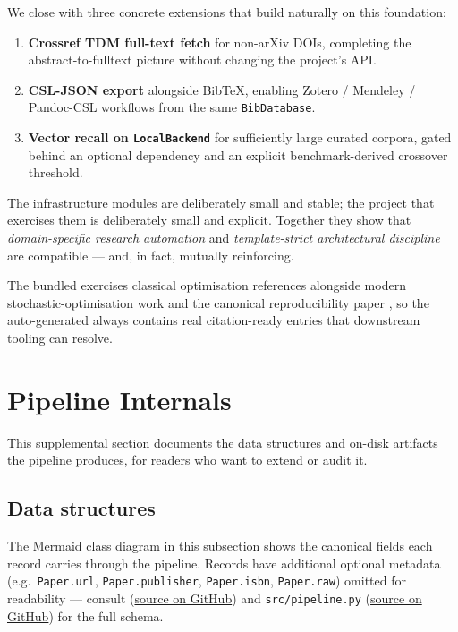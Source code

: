 \documentclass[
  english,
]{article}
\providecommand{\tightlist}{%
  \setlength{\itemsep}{0pt}\setlength{\parskip}{0pt}}
\begin{document}
We close with three concrete extensions that build naturally on this
foundation:

\begin{enumerate}
\def\labelenumi{\arabic{enumi}.}
\tightlist
\item
  \textbf{Crossref TDM full-text fetch} for non-arXiv DOIs, completing
  the abstract-to-fulltext picture without changing the project's API.
\item
  \textbf{CSL-JSON export} alongside BibTeX, enabling Zotero / Mendeley
  / Pandoc-CSL workflows from the same \texttt{BibDatabase}.
\item
  \textbf{Vector recall on \texttt{LocalBackend}} for sufficiently large
  curated corpora, gated behind an optional dependency and an explicit
  benchmark-derived crossover threshold.
\end{enumerate}

The infrastructure modules are deliberately small and stable; the
project that exercises them is deliberately small and explicit. Together
they show that \emph{domain-specific research automation} and
\emph{template-strict architectural discipline} are compatible --- and,
in fact, mutually reinforcing.

The bundled  exercises classical optimisation
references
\citep{boyd2004convex, nocedal2006numerical, nesterov2013gradient}
alongside modern stochastic-optimisation work
\citep{kingma2014adam, reddi2018convergence} and the canonical
reproducibility paper \citep{peng2011reproducible}, so the
auto-generated  always contains real
citation-ready entries that downstream tooling can resolve.

\newpage

\section{Pipeline Internals}\label{sec:pipeline_internals}

This supplemental section documents the data structures and on-disk
artifacts the pipeline produces, for readers who want to extend or audit
it.

\subsection{Data structures}\label{data-structures}

The Mermaid class diagram in this subsection shows the canonical fields
each record carries through the pipeline. Records have additional
optional metadata (e.g.~\texttt{Paper.url}, \texttt{Paper.publisher},
\texttt{Paper.isbn}, \texttt{Paper.raw}) omitted for readability ---
consult 
(\href{https://github.com/docxology/template/tree/main/infrastructure/search/literature}{source
on GitHub}) and \texttt{src/pipeline.py}
(\href{https://github.com/docxology/template/tree/main/projects/templates/template_search_project/src}{source
on GitHub}) for the full schema.
\end{document}
